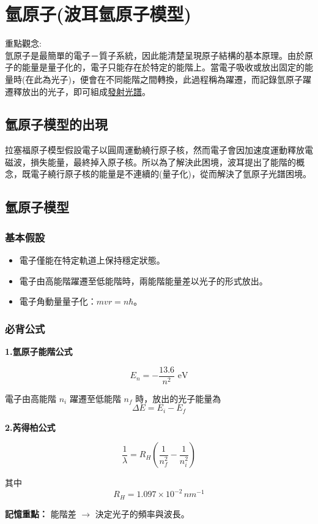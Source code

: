 \section{氫原子(波耳氫原子模型)}

\begin{concept}
重點觀念:\\
氫原子是最簡單的電子－質子系統，因此能清楚呈現原子結構的基本原理。由於原子的能量是量子化的，電子只能存在於特定的能階上。當電子吸收或放出固定的能量時(在此為光子)，便會在不同能階之間轉換，此過程稱為躍遷，而記錄氫原子躍遷釋放出的光子，即可組成\underline{發射光譜}。
\end{concept}
\subsection{氫原子模型的出現}
拉塞福原子模型假設電子以圓周運動繞行原子核，然而電子會因加速度運動釋放電磁波，損失能量，最終掉入原子核。所以為了解決此困境，波耳提出了能階的概念，既電子繞行原子核的能量是不連續的(量子化)，從而解決了氫原子光譜困境。

\subsection{氫原子模型}
\subsubsection{基本假設}
\begin{itemize}
    \item 電子僅能在特定軌道上保持穩定狀態。
    \item 電子由高能階躍遷至低能階時，兩能階能量差以光子的形式放出。
    \item 電子角動量量子化：$mvr=n\hbar$。
\end{itemize}

\subsubsection{必背公式}

\begin{trick}
\textbf{1.氫原子能階公式}

\[
E_n=-\frac{13.6}{n^2} \text{ eV}
\]

電子由高能階 $n_i$ 躍遷至低能階 $n_f$ 時，放出的光子能量為
\[
\Delta E = E_i - E_f
\]

\vspace{0.3cm}

\textbf{2.芮得柏公式}

\[
\frac{1}{\lambda}=R_H
\left(
\frac{1}{n_f^2}-\frac{1}{n_i^2}
\right)
\]

其中
\[
R_H = 1.097\times10^{-2}\,nm^{-1}
\]

\textbf{記憶重點：}
能階差 $\rightarrow$ 決定光子的頻率與波長。
\end{trick}

